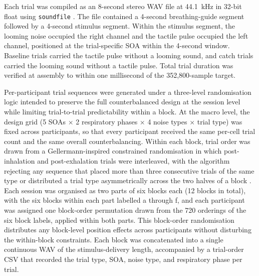 Each trial was compiled as an 8-second stereo WAV file at 44.1~kHz in 32-bit float using \texttt{soundfile} \citep{sounddevice_python}. The file contained a 4-second breathing-guide segment followed by a 4-second stimulus segment. Within the stimulus segment, the looming noise occupied the right channel and the tactile pulse occupied the left channel, positioned at the trial-specific SOA within the 4-second window. Baseline trials carried the tactile pulse without a looming sound, and catch trials carried the looming sound without a tactile pulse. Total trial duration was verified at assembly to within one millisecond of the 352{,}800-sample target.

Per-participant trial sequences were generated under a three-level randomisation logic intended to preserve the full counterbalanced design at the session level while limiting trial-to-trial predictability within a block. At the macro level, the design grid (5 SOAs $\times$ 2 respiratory phases $\times$ 4 noise types $\times$ trial type) was fixed across participants, so that every participant received the same per-cell trial count and the same overall counterbalancing. Within each block, trial order was drawn from a Gellermann-inspired constrained randomisation in which post-inhalation and post-exhalation trials were interleaved, with the algorithm rejecting any sequence that placed more than three consecutive trials of the same type or distributed a trial type asymmetrically across the two halves of a block \citep{gellermann_1933}. Each session was organised as two parts of six blocks each (12 blocks in total), with the six blocks within each part labelled a through f, and each participant was assigned one block-order permutation drawn from the 720 orderings of the six block labels, applied within both parts. This block-order randomisation distributes any block-level position effects across participants without disturbing the within-block constraints. Each block was concatenated into a single continuous WAV of the stimulus-delivery length, accompanied by a trial-order CSV that recorded the trial type, SOA, noise type, and respiratory phase per trial.

